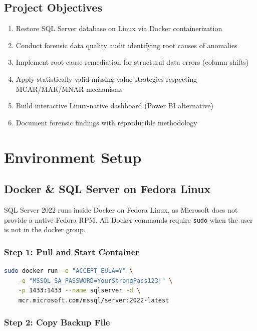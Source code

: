 \documentclass[12pt,a4paper]{article}
\begin{document}
\subsection{Project Objectives}

\begin{enumerate}
    \item Restore SQL Server database on Linux via Docker containerization
    \item Conduct forensic data quality audit identifying root causes of anomalies
    \item Implement root-cause remediation for structural data errors (column shifts)
    \item Apply statistically valid missing value strategies respecting MCAR/MAR/MNAR mechanisms
    \item Build interactive Linux-native dashboard (Power BI alternative)
    \item Document forensic findings with reproducible methodology
\end{enumerate}

\section{Environment Setup}

\subsection{Docker \& SQL Server on Fedora Linux}

SQL Server 2022 runs inside Docker on Fedora Linux, as Microsoft does not provide a native Fedora RPM. All Docker commands require \texttt{sudo} when the user is not in the docker group.

\subsubsection{Step 1: Pull and Start Container}

\begin{lstlisting}[language=bash]
sudo docker run -e "ACCEPT_EULA=Y" \
    -e "MSSQL_SA_PASSWORD=YourStrongPass123!" \
    -p 1433:1433 --name sqlserver -d \
    mcr.microsoft.com/mssql/server:2022-latest
\end{lstlisting}

\subsubsection{Step 2: Copy Backup File}
\end{document}
